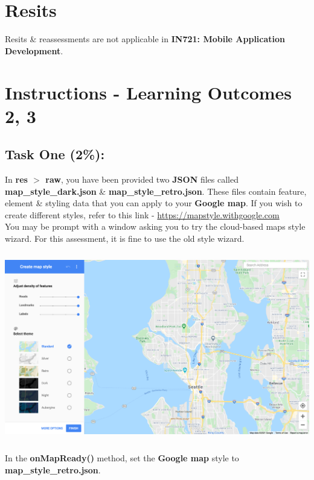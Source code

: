 \documentclass{article}
\begin{document}
\section*{Resits}
Resits \& reassessments are not applicable in \textbf{IN721: Mobile Application Development}.

\section*{Instructions - Learning Outcomes 2, 3}
\subsection*{Task One (2\%):}
In \textbf{res $>$ raw}, you have been provided two \textbf{JSON} files called \textbf{map\_style\_dark.json} \& \textbf{map\_style\_retro.json}. These files contain feature, element \& styling data that you can apply to your \textbf{Google map}. If you wish to create different styles, refer to this link - \href{https://mapstyle.withgoogle.com}{https://mapstyle.withgoogle.com} \\

You may be prompt with a window asking you to try the cloud-based maps style wizard. For this assessment, it is fine to use the old style wizard. \\

\includegraphics[width=15cm, height=9cm]{../tex/img/practicals/05-companies-1.png} \\

In the \textbf{onMapReady()} method, set the \textbf{Google map} style to \textbf{map\_style\_retro.json}. \\
\end{document}
